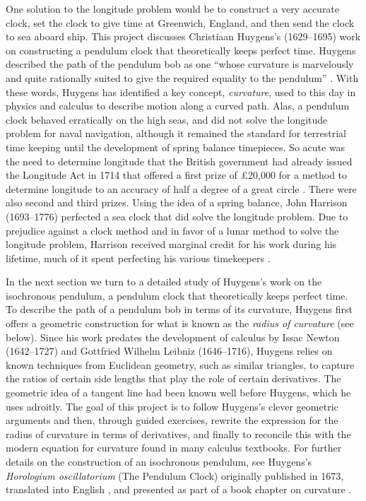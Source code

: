 \documentclass[12pt]{article}
\theoremstyle{definition}
\begin{document}
One solution to the longitude problem would be to construct a very
accurate clock, set the clock to give time at Greenwich, England, and
then send the clock to sea aboard ship.  This project discusses
Christiaan Huygens's (1629--1695) work on constructing a pendulum
clock that theoretically keeps perfect time.  Huygens described the
path of the pendulum bob as one ``whose curvature is marvelously and
quite rationally suited to give the required equality to the
pendulum'' \cite[p.11]{Blackwell}.  With these words, Huygens has
identified a key concept, {\em curvature}, used to this day in physics
and calculus to describe motion along a curved path.  Alas, a pendulum
clock behaved erratically on the high seas, and did not solve the
longitude problem for naval navigation, although it remained the
standard for terrestrial time keeping until the development of spring balance
timepieces.  So acute was the need to
determine longitude that the British government had already issued the
Longitude Act in 1714 that offered a first prize of \pounds 20,000
for a method to determine longitude to an accuracy of half a degree of
a great circle \cite[p.66]{Sobel}.  There were also second and third
prizes.  Using the idea of a spring
balance, John Harrison (1693--1776) perfected a sea clock that did
solve the longitude problem.  Due to prejudice against a clock method
and in favor of a lunar method to solve the longitude problem,
Harrison received marginal credit for his work during his lifetime, 
much of it spent perfecting his various timekeepers \cite{Sobel}.  

In the next section we turn to a detailed study of Huygens's work on
the isochronous pendulum, a pendulum clock that theoretically
keeps perfect time.  To describe the path of a pendulum bob in terms
of its curvature, Huygens first offers a geometric construction for
what is known as the {\em radius of curvature} (see below).  Since his
work predates the development of calculus by Issac Newton
(1642--1727) and Gottfried Wilhelm Leibniz (1646--1716), Huygens
relies on known techniques from Euclidean geometry, such as similar triangles, to
capture the ratios of certain side lengths that play the role of
certain derivatives.  The geometric idea of a tangent line had been known
well before Huygens, which he uses adroitly.   
The goal of this project is to follow Huygens's
clever geometric arguments and then, through guided exercises,
rewrite the expression for the radius of curvature in terms of
derivatives, and finally to reconcile this with the modern equation
for curvature found in many calculus textbooks.  For further details
on the construction of an isochronous pendulum, see Huygens's {\em
  Horologium oscillatorium} (The Pendulum Clock) 
\cite[pp. 86--365]{Huygens} originally published in 1673, translated
into English \cite{Blackwell}, and presented as part of a book chapter
on curvature \cite[pp. 174--178]{Knoebel}.
\end{document}
